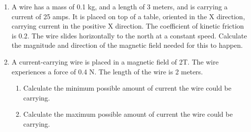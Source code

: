 \documentclass[letterpaper, 12pt]{article}
\begin{document}
\begin{enumerate}
	\vspace{1.25in}
	
	
	\item A wire has a mass of 0.1 kg, and a length of 3 meters, and is carrying a current of 25 amps.  It is placed on top of a table, oriented in the X direction, carrying current in the positive X direction.  The coefficient of kinetic friction is 0.2. The wire slides horizontally to the north at a constant speed.  Calculate the magnitude and direction of the magnetic field needed for this to happen.
		
	\vspace{1.25in}
	\item A current-carrying wire is placed in a magnetic field of 2T.  The wire experiences a force of 0.4 N.    The length of the wire is 2 meters.
	
	\begin{enumerate}
		\item Calculate the minimum possible amount of current the wire could be carrying.
		\vspace{1.5in}
		\item Calculate the maximum possible amount of current the wire could be carrying.
	\end{enumerate}
	
\end{enumerate}
 
\end{document}
